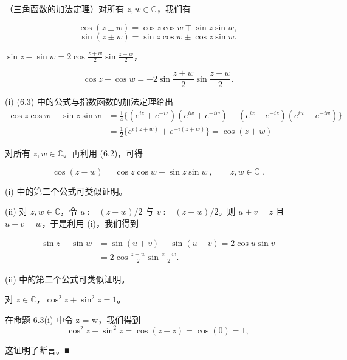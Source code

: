 \begin{proposition}

（三角函数的加法定理）对所有 $ z, w \in \mathbb{C} $，我们有

\begin{subitems}
\item
\[
\cos(z\pm w)=\cos z\cos w\mp\sin z\sin w,
\]
\[
\sin(z\pm w)=\sin z\cos w\pm\cos z\sin w.
\]
\item

$ \sin z - \sin w = 2 \cos \frac{z + w}{2} \sin \frac{z - w}{2} $，

\[
\cos z-\cos w=-2\sin\frac{z+w}{2}\sin\frac{z-w}{2}.
\]

\proofhead
(i) (6.3) 中的公式与指数函数的加法定理给出
\begin{equation*}
\begin{aligned}
\cos z\cos w-\sin z\sin w&=\frac{1}{4}\big\{(e^{iz}+e^{-iz})(e^{iw}+e^{-iw})+(e^{iz}-e^{-iz})(e^{iw}-e^{-iw})\big\}\\&=\frac{1}{2}\big\{e^{i(z+w)}+e^{-i(z+w)}\big\}=\cos(z+w)
\end{aligned}
\end{equation*}

对所有 $ z, w \in \mathbb{C} $。再利用 (6.2)，可得

\[
\cos(z-w)=\cos z\cos w+\sin z\sin w~,\qquad z,w\in\mathbb{C}~.
\]
\end{subitems}

(i) 中的第二个公式可类似证明。

(ii) 对 $ z, w \in \mathbb{C} $，令 $ u := (z + w)/2 $ 与 $ v := (z - w)/2 $。则 $ u + v = z $ 且 $ u - v = w $，于是利用 (i)，我们得到

\begin{equation*}
\begin{aligned}
\sin z-\sin w&=\sin(u+v)-\sin(u-v)=2\cos u\sin v\\&=2\cos\frac{z+w}{2}\sin\frac{z-w}{2}.
\end{aligned}
\end{equation*}

(ii) 中的第二个公式可类似证明。

\end{proposition}

\begin{corollary}

对 $ z \in \mathbb{C} $，$ \cos^2 z + \sin^2 z = 1 $。

\proofhead
在命题 6.3(i) 中令 z = w，我们得到
\[
\cos^{2}z+\sin^{2}z=\cos(z-z)=\cos(0)=1,
\]

这证明了断言。■

\end{corollary}

